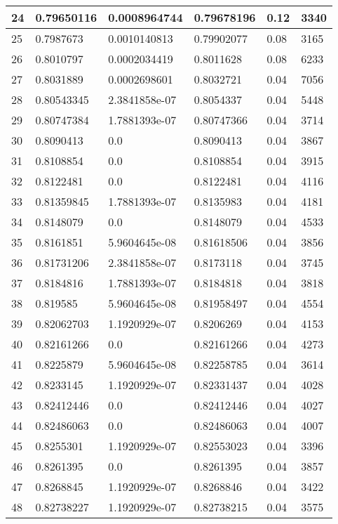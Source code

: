 \begin{longtable}{|l|l|l|l|l|l|}
24 & 0.79650116 & 0.0008964744 & 0.79678196 & 0.12 & 3340 \\ \hline 
25 & 0.7987673 & 0.0010140813 & 0.79902077 & 0.08 & 3165 \\ \hline 
26 & 0.8010797 & 0.0002034419 & 0.8011628 & 0.08 & 6233 \\ \hline 
27 & 0.8031889 & 0.0002698601 & 0.8032721 & 0.04 & 7056 \\ \hline 
28 & 0.80543345 & 2.3841858e-07 & 0.8054337 & 0.04 & 5448 \\ \hline 
29 & 0.80747384 & 1.7881393e-07 & 0.80747366 & 0.04 & 3714 \\ \hline 
30 & 0.8090413 & 0.0 & 0.8090413 & 0.04 & 3867 \\ \hline 
31 & 0.8108854 & 0.0 & 0.8108854 & 0.04 & 3915 \\ \hline 
32 & 0.8122481 & 0.0 & 0.8122481 & 0.04 & 4116 \\ \hline 
33 & 0.81359845 & 1.7881393e-07 & 0.8135983 & 0.04 & 4181 \\ \hline 
34 & 0.8148079 & 0.0 & 0.8148079 & 0.04 & 4533 \\ \hline 
35 & 0.8161851 & 5.9604645e-08 & 0.81618506 & 0.04 & 3856 \\ \hline 
36 & 0.81731206 & 2.3841858e-07 & 0.8173118 & 0.04 & 3745 \\ \hline 
37 & 0.8184816 & 1.7881393e-07 & 0.8184818 & 0.04 & 3818 \\ \hline 
38 & 0.819585 & 5.9604645e-08 & 0.81958497 & 0.04 & 4554 \\ \hline 
39 & 0.82062703 & 1.1920929e-07 & 0.8206269 & 0.04 & 4153 \\ \hline 
40 & 0.82161266 & 0.0 & 0.82161266 & 0.04 & 4273 \\ \hline 
41 & 0.8225879 & 5.9604645e-08 & 0.82258785 & 0.04 & 3614 \\ \hline 
42 & 0.8233145 & 1.1920929e-07 & 0.82331437 & 0.04 & 4028 \\ \hline 
43 & 0.82412446 & 0.0 & 0.82412446 & 0.04 & 4027 \\ \hline 
44 & 0.82486063 & 0.0 & 0.82486063 & 0.04 & 4007 \\ \hline 
45 & 0.8255301 & 1.1920929e-07 & 0.82553023 & 0.04 & 3396 \\ \hline 
46 & 0.8261395 & 0.0 & 0.8261395 & 0.04 & 3857 \\ \hline 
47 & 0.8268845 & 1.1920929e-07 & 0.8268846 & 0.04 & 3422 \\ \hline 
48 & 0.82738227 & 1.1920929e-07 & 0.82738215 & 0.04 & 3575 \\ \hline 

\end{longtable}
